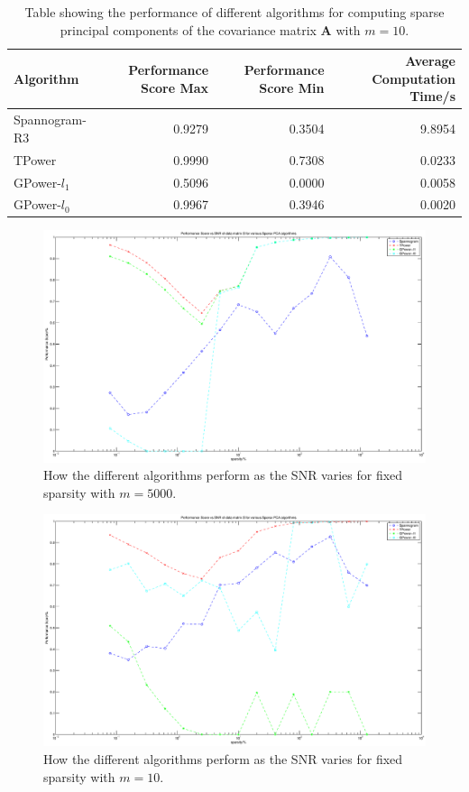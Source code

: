 \documentclass[11pt,a4paper]{article}
\begin{document}
\begin{table}[H]
\center
\begin{tabular}{|l|r|r|r|}
\hline
Algorithm &  Performance Score Max &  Performance Score Min & Average Computation Time/s\\
\hline
Spannogram-R3&       0.9279 &   0.3504 &   9.8954\\
 TPower  &    0.9990  &  0.7308  &  0.0233\\
   GPower-$l_1$&      0.5096       &  0.0000   & 0.0058\\
    GPower-$l_0$&   0.9967    &0.3946 &   0.0020\\
\hline

\end{tabular}
\caption{Table showing the performance of different algorithms for computing sparse principal components of the covariance matrix $\mathbf{A}$ with $m=10$.}
\label{performance_10}
\end{table}

\begin{figure}[H]
\centering
\includegraphics[scale=0.3]{performance_score_vs_snr_5000.eps}
\caption{How the different algorithms perform as the SNR varies for fixed sparsity with $m = 5000$.}
\label{cpev_5000}
\end{figure}

\begin{figure}[H]
\centering
\includegraphics[scale=0.3]{performance_score_vs_snr_10.eps}
\caption{How the different algorithms perform as the SNR varies for fixed sparsity with $m = 10$.}
\label{cpev_10}
\end{figure}
\end{document}
